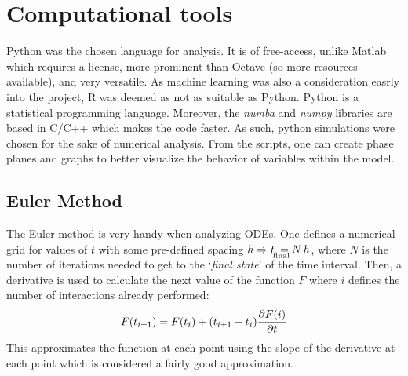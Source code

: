 \documentclass[class={myRUCProject}, crop=false]{standalone}
\begin{document}
\section{Computational tools}
Python was the chosen language for analysis. It is of free-access, unlike Matlab which requires a license, more prominent than Octave (so more resources available), and very versatile. 
As machine learning was also a consideration easrly into the project, R was deemed as not as suitable as Python. Python is a statistical programming language. Moreover, the \emph{numba} and \emph{numpy} libraries are based in C/C++ which makes the code faster.
As such, python simulations were chosen for the sake of numerical analysis. 
From the scripts, one can create phase planes and graphs to better visualize the behavior of variables within the model. 


\subsection{Euler Method}
The Euler method is very handy when analyzing ODEs. One defines a numerical grid for values of \(t\) with some pre-defined spacing $h \implies t_{\!\raisebox{0ex}[0ex][0ex]{\raisebox{-0.75ex}{$\mathrlap{\text{\scriptsize final}}$}}}\ = N\,h$,  where \(N\) is the number of iterations needed to get to the `\emph{final state}' of the time interval. %
Then, a derivative is used to calculate the next value of the function \(F\) where \(i\) defines the number of interactions already performed:
\begin{align}
    F(t_{i+1}) = F(t_{i}) + (t_{i+1} - t_{i}) \frac{\partial F\!\left(i\right)}{\partial t}
\end{align}
This approximates the function at each point using the slope of the derivative at each point which is considered a fairly good approximation.
\end{document}
